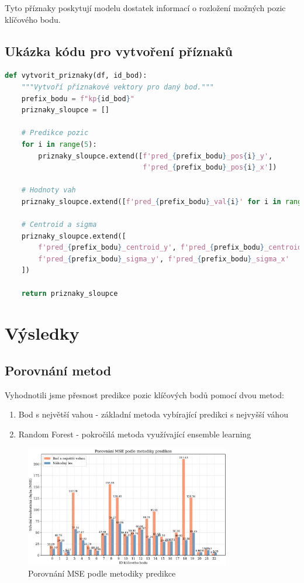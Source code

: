 \documentclass[a4paper,12pt]{article}
\begin{document}
Tyto příznaky poskytují modelu dostatek informací o rozložení možných pozic klíčového bodu.

\subsection{Ukázka kódu pro vytvoření příznaků}

\begin{lstlisting}[language=Python, caption=Funkce pro vytvoření příznaků]
def vytvorit_priznaky(df, id_bod):
    """Vytvoří příznakové vektory pro daný bod."""
    prefix_bodu = f"kp{id_bod}"
    priznaky_sloupce = []
    
    # Predikce pozic
    for i in range(5):
        priznaky_sloupce.extend([f'pred_{prefix_bodu}_pos{i}_y', 
                                 f'pred_{prefix_bodu}_pos{i}_x'])
    
    # Hodnoty vah
    priznaky_sloupce.extend([f'pred_{prefix_bodu}_val{i}' for i in range(5)])
    
    # Centroid a sigma
    priznaky_sloupce.extend([
        f'pred_{prefix_bodu}_centroid_y', f'pred_{prefix_bodu}_centroid_x',
        f'pred_{prefix_bodu}_sigma_y', f'pred_{prefix_bodu}_sigma_x'
    ])
    
    return priznaky_sloupce
\end{lstlisting}

\section{Výsledky}
\label{sec:results}

\subsection{Porovnání metod}

Vyhodnotili jsme přesnost predikce pozic klíčových bodů pomocí dvou metod:
\begin{enumerate}
    \item Bod s největší vahou - základní metoda vybírající predikci s nejvyšší váhou
    \item Random Forest - pokročilá metoda využívající ensemble learning
\end{enumerate}

\begin{figure}[H]
    \centering
    \includegraphics[width=0.8\textwidth]{mse_porovnani.png}
    \caption{Porovnání MSE podle metodiky predikce}
    \label{fig:mse_comparison}
\end{figure}
\end{document}
